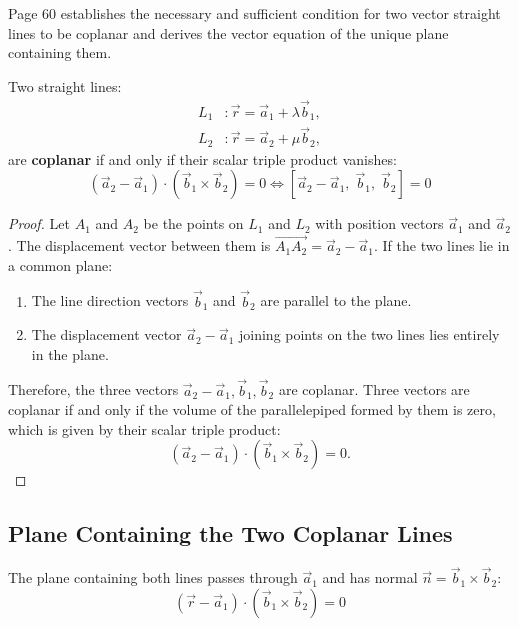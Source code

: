 \begin{conceptbox}
Page 60 establishes the necessary and sufficient condition for two vector straight lines to be coplanar and derives the vector equation of the unique plane containing them.
\end{conceptbox}

\begin{theorembox}
Two straight lines:
\begin{align}
    L_1 &: \vec{r} = \vec{a}_1 + \lambda \vec{b}_1, \\
    L_2 &: \vec{r} = \vec{a}_2 + \mu \vec{b}_2,
\end{align}
are \textbf{coplanar} if and only if their scalar triple product vanishes:
\begin{equation}
    \boxed{(\vec{a}_2 - \vec{a}_1) \cdot (\vec{b}_1 \times \vec{b}_2) = 0 \iff [\vec{a}_2 - \vec{a}_1, \; \vec{b}_1, \; \vec{b}_2] = 0}
\end{equation}
\end{theorembox}

\begin{proof}
Let $A_1$ and $A_2$ be the points on $L_1$ and $L_2$ with position vectors $\vec{a}_1$ and $\vec{a}_2$.
The displacement vector between them is $\vec{A_1 A_2} = \vec{a}_2 - \vec{a}_1$.
If the two lines lie in a common plane:
\begin{enumerate}
    \item The line direction vectors $\vec{b}_1$ and $\vec{b}_2$ are parallel to the plane.
    \item The displacement vector $\vec{a}_2 - \vec{a}_1$ joining points on the two lines lies entirely in the plane.
\end{enumerate}
Therefore, the three vectors $\vec{a}_2 - \vec{a}_1, \vec{b}_1, \vec{b}_2$ are coplanar.
Three vectors are coplanar if and only if the volume of the parallelepiped formed by them is zero, which is given by their scalar triple product:
\begin{equation}
    (\vec{a}_2 - \vec{a}_1) \cdot (\vec{b}_1 \times \vec{b}_2) = 0.
\end{equation}
\end{proof}

\subsection{Plane Containing the Two Coplanar Lines}
The plane containing both lines passes through $\vec{a}_1$ and has normal $\vec{n} = \vec{b}_1 \times \vec{b}_2$:
\begin{equation}
    \boxed{(\vec{r} - \vec{a}_1) \cdot (\vec{b}_1 \times \vec{b}_2) = 0}
\end{equation}

